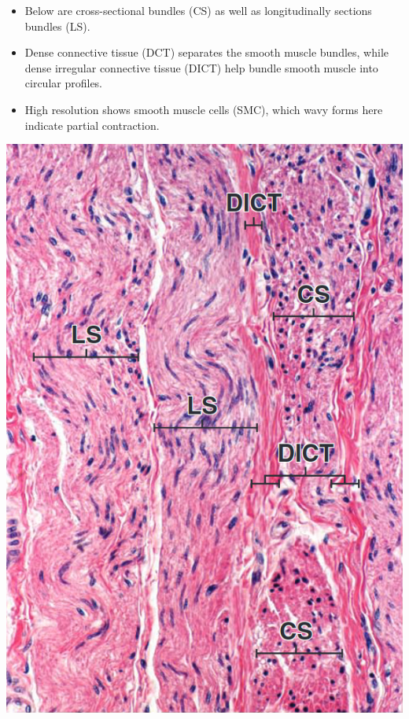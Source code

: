 \begin{itemize}
\begin{itemize}
      \item Below are cross-sectional bundles (CS) as well as longitudinally sections bundles (LS). 
      \item Dense connective tissue (DCT) separates the smooth muscle bundles, while dense irregular connective tissue (DICT) help bundle smooth muscle into circular profiles.
      \item High resolution shows smooth muscle cells (SMC), which wavy forms here indicate partial contraction.
    \end{itemize}
  \begin{center}
    \includegraphics[scale=0.25]{images/week-1-rp11.jpg} 

\end{center}
\end{itemize}
